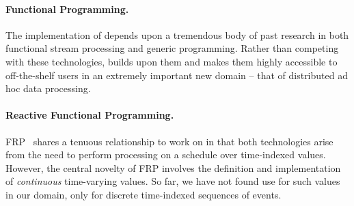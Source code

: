 

\paragraph*{Functional Programming.}
The implementation of \padsd{} depends upon a tremendous body of past research
in both functional stream processing and generic programming.  Rather than
competing with these technologies, \padsd{} builds upon them and makes them
highly accessible to off-the-shelf users
in an extremely important new domain -- that of distributed ad hoc
data processing.

\paragraph*{Reactive Functional Programming.}
FRP~\cite{elliot+:frp} shares a tenuous relationship to work on \padsd{}
in that both technologies arise from the need to perform processing
on a schedule over time-indexed values.  However, the central novelty
of FRP involves the definition and implementation of {\em continuous} 
time-varying values.  So far, we have not found use for such
values in our domain, only for discrete time-indexed
sequences of events.

